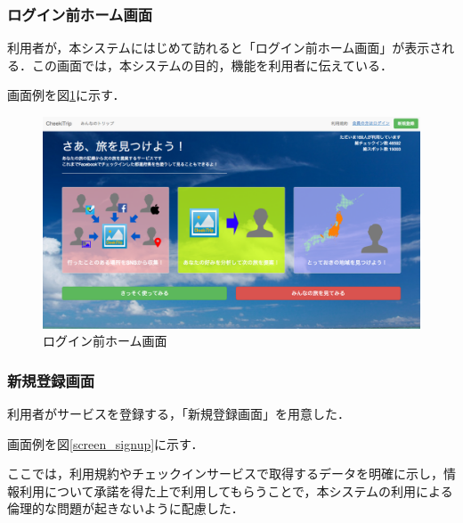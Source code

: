 \documentclass{jsarticle}
\begin{document}
\subsubsection{ログイン前ホーム画面}

利用者が，本システムにはじめて訪れると「ログイン前ホーム画面」が表示される．この画面では，本システムの目的，機能を利用者に伝えている．

画面例を図\ref{screen_home_before_login}に示す．

\begin{figure}[!ht]
\begin{center}
\includegraphics[width=12.0cm]{./image/cheektrip_top_before_login.png}
\caption{ログイン前ホーム画面}
\label{screen_home_before_login}
\end{center}
\end{figure}

\subsubsection{新規登録画面}

利用者がサービスを登録する，「新規登録画面」を用意した．

画面例を図\ref{screen_signup}に示す．

ここでは，利用規約やチェックインサービスで取得するデータを明確に示し，情報利用について承諾を得た上で利用してもらうことで，本システムの利用による倫理的な問題が起きないように配慮した．
\end{document}
